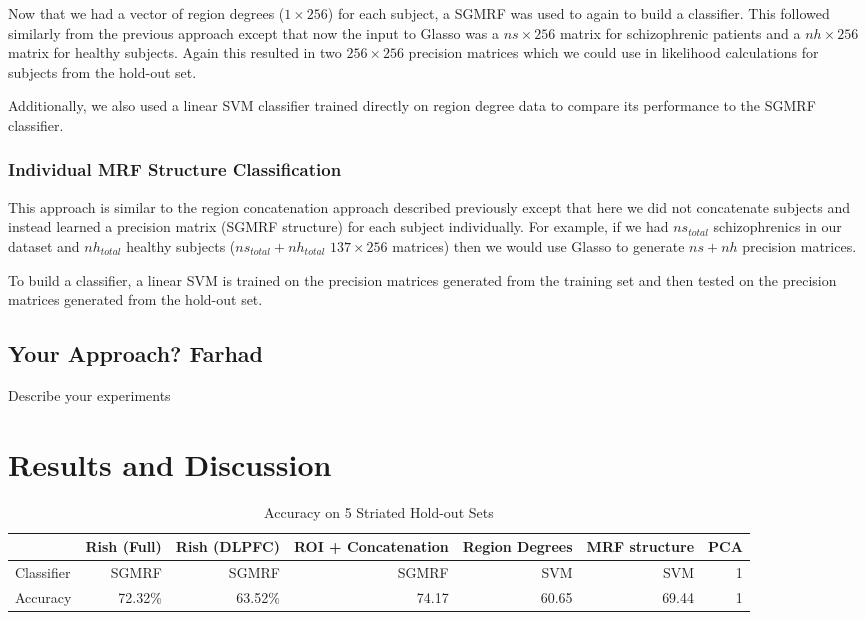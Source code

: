 \documentclass{article} %
\begin{document}
Now that we had a vector of region degrees ($1 \times 256$) for each subject,
a SGMRF was used to again to build a classifier. This followed similarly from
the previous approach except that now the input to Glasso was a $ns \times 256$
matrix for schizophrenic patients and a $nh \times256$ matrix for healthy
subjects. Again this resulted in two $256 \times 256$ precision matrices which
we could use in likelihood calculations for subjects from the hold-out set.

Additionally, we also used a linear SVM classifier trained directly on
region degree data to compare its performance to the SGMRF classifier.

\subsubsection{Individual MRF Structure Classification}
This approach is similar to the region concatenation approach described 
previously except that here we did not concatenate subjects and instead
learned a precision matrix (SGMRF structure) for each subject 
individually. For example, if we had $ns_{total}$ schizophrenics in our 
dataset and $nh_{total}$ healthy subjects ($ns_{total} + nh_{total}$ 
$137 \times 256$ matrices) then we would use Glasso to generate $ns + nh$ 
precision matrices.

To build a classifier, a linear SVM is trained on the precision matrices 
generated from the training set and then tested on the precision matrices 
generated from the hold-out set.

\subsection{Your Approach? Farhad}
Describe your experiments


\section{Results and Discussion}

\begin{table}[!htb]\footnotesize
\begin{center}
    \begin{tabular}{| l | r | r | r | r | r | r |}
    \hline
                & Rish (Full) & Rish (DLPFC) & ROI + Concatenation & Region Degrees & MRF structure & PCA \\ \hline
    Classifier  & SGMRF       & SGMRF        & SGMRF               & SVM            & SVM           &1    \\ \hline
    Accuracy    & 72.32\%     & 63.52\%      & 74.17               & 60.65          & 69.44         &1    \\ \hline
    \end{tabular}
    \caption{Accuracy on 5 Striated Hold-out Sets}
     \label{fig:holdout_table}
\end{center}
\end{table}
\end{document}
